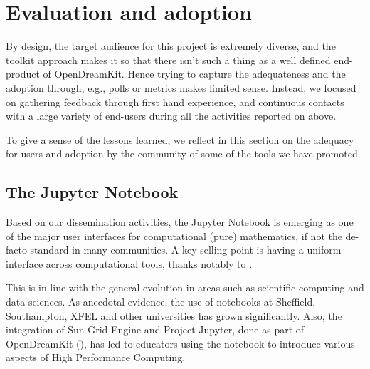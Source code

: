 \documentclass{deliverablereport}
\begin{document}




\section{Evaluation and adoption}

By design, the target audience for this project is extremely diverse,
and the toolkit approach makes it so that there isn't such a thing as
a well defined end-product of OpenDreamKit. Hence trying to capture
the adequateness and the adoption through, e.g., polls or metrics
makes limited sense. Instead, we focused on gathering feedback through
first hand experience, and continuous contacts with a large variety of
end-users during all the activities reported on above.

To give a sense of the lessons learned, we reflect in this section on
the adequacy for users and adoption by the community of some of the
tools we have promoted.

\subsection{The Jupyter Notebook}

Based on our dissemination activities, the Jupyter Notebook is
emerging as one of the major user interfaces for computational (pure)
mathematics, if not the de-facto standard in many communities. A key
selling point is having a uniform interface across computational
tools, thanks notably to .

This is in line with the general evolution in areas such as scientific
computing and data sciences. As anecdotal evidence, the use of
notebooks at Sheffield, Southampton, XFEL and other universities has
grown significantly. Also, the integration of Sun Grid Engine and
Project Jupyter, done as part of OpenDreamKit
(), has led to educators using the
notebook to introduce various aspects of High Performance Computing.
\end{document}
